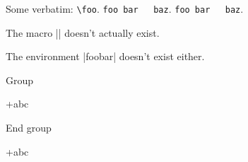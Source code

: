 \documentclass{nlctdoc}
\begin{document}
Some verbatim: \verb"\foo". \verb*"foo bar   baz".
\verb"foo bar   baz".

\index{\foo}

\DescribeMacro{\foo}The macro |\foo| doesn't actually exist.

The environment |foobar| doesn't exist either.

\MakeShortVerb{+}

Group

{
+abc%
}

End group

+abc%

\PrintIndex
\end{document}
